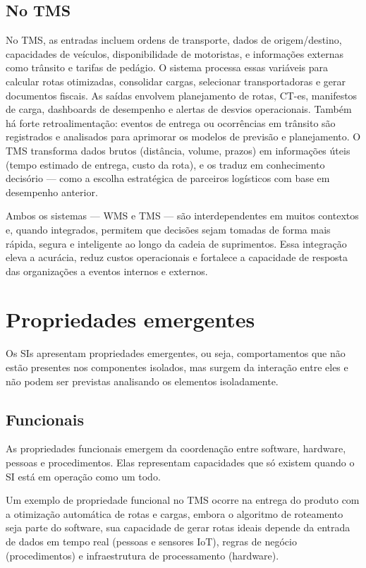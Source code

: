 \documentclass[conference]{IEEEtran}
\begin{document}
\subsection{No TMS}
No TMS, as entradas incluem ordens de transporte, dados de origem/destino, capacidades de veículos, disponibilidade de motoristas, e informações externas como trânsito e tarifas de pedágio. O sistema processa essas variáveis para calcular rotas otimizadas, consolidar cargas, selecionar transportadoras e gerar documentos fiscais. As saídas envolvem planejamento de rotas, CT-es, manifestos de carga, dashboards de desempenho e alertas de desvios operacionais. Também há forte retroalimentação: eventos de entrega ou ocorrências em trânsito são registrados e analisados para aprimorar os modelos de previsão e planejamento. O TMS transforma dados brutos (distância, volume, prazos) em informações úteis (tempo estimado de entrega, custo da rota), e os traduz em conhecimento decisório — como a escolha estratégica de parceiros logísticos com base em desempenho anterior.

Ambos os sistemas — WMS e TMS — são interdependentes em muitos contextos e, quando integrados, permitem que decisões sejam tomadas de forma mais rápida, segura e inteligente ao longo da cadeia de suprimentos. Essa integração eleva a acurácia, reduz custos operacionais e fortalece a capacidade de resposta das organizações a eventos internos e externos.

\section{Propriedades emergentes}
Os SIs apresentam propriedades emergentes, ou seja, comportamentos que não estão presentes nos componentes isolados, mas surgem da interação entre eles e não podem ser previstas analisando os elementos isoladamente.
\subsection{Funcionais}
As propriedades funcionais emergem da coordenação entre software, hardware, pessoas e procedimentos. Elas representam capacidades que só existem quando o SI está em operação como um todo. 

Um exemplo de propriedade funcional no TMS ocorre na entrega do produto com a otimização automática de rotas e cargas, embora o algoritmo de roteamento seja parte do software, sua capacidade de gerar rotas ideais depende da entrada de dados em tempo real (pessoas e sensores IoT), regras de negócio (procedimentos) e infraestrutura de processamento (hardware).
\end{document}
